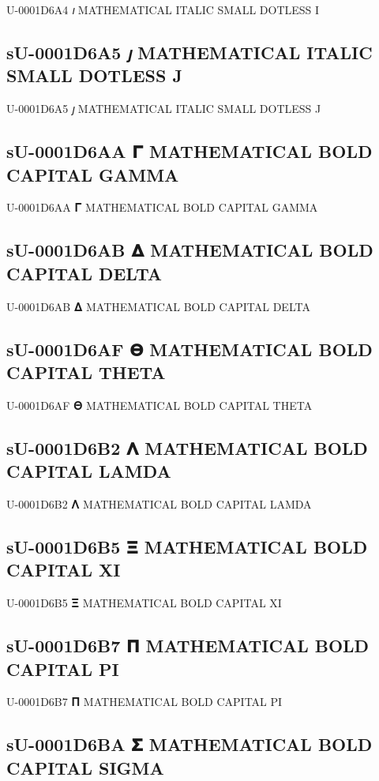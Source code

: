 U-0001D6A4 𝚤 MATHEMATICAL ITALIC SMALL DOTLESS I

\subsection{sU-0001D6A5 𝚥 MATHEMATICAL ITALIC SMALL DOTLESS J}

U-0001D6A5 𝚥 MATHEMATICAL ITALIC SMALL DOTLESS J

\subsection{sU-0001D6AA 𝚪 MATHEMATICAL BOLD CAPITAL GAMMA}

U-0001D6AA 𝚪 MATHEMATICAL BOLD CAPITAL GAMMA

\subsection{sU-0001D6AB 𝚫 MATHEMATICAL BOLD CAPITAL DELTA}

U-0001D6AB 𝚫 MATHEMATICAL BOLD CAPITAL DELTA

\subsection{sU-0001D6AF 𝚯 MATHEMATICAL BOLD CAPITAL THETA}

U-0001D6AF 𝚯 MATHEMATICAL BOLD CAPITAL THETA

\subsection{sU-0001D6B2 𝚲 MATHEMATICAL BOLD CAPITAL LAMDA}

U-0001D6B2 𝚲 MATHEMATICAL BOLD CAPITAL LAMDA

\subsection{sU-0001D6B5 𝚵 MATHEMATICAL BOLD CAPITAL XI}

U-0001D6B5 𝚵 MATHEMATICAL BOLD CAPITAL XI

\subsection{sU-0001D6B7 𝚷 MATHEMATICAL BOLD CAPITAL PI}

U-0001D6B7 𝚷 MATHEMATICAL BOLD CAPITAL PI

\subsection{sU-0001D6BA 𝚺 MATHEMATICAL BOLD CAPITAL SIGMA}

